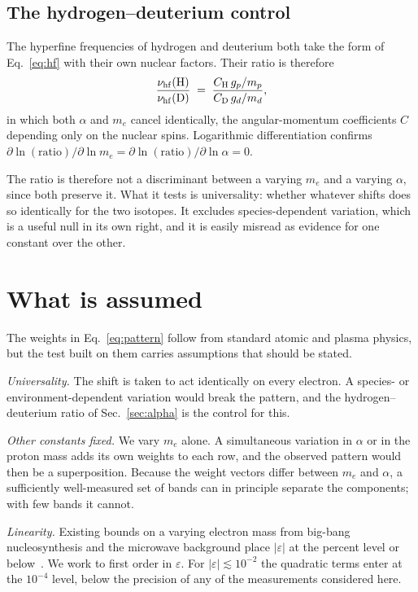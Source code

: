 \documentclass[aps,prd,twocolumn,superscriptaddress,nofootinbib,10pt]{revtex4-2}
\begin{document}
\subsection{The hydrogen--deuterium control}

The hyperfine frequencies of hydrogen and deuterium both take the form of Eq.~\eqref{eq:hf} with
their own nuclear factors. Their ratio is therefore
%
\begin{equation}
  \frac{\nu_{\rm hf}({\rm H})}{\nu_{\rm hf}({\rm D})}
  \;=\; \frac{C_{\rm H}\, g_p / m_p}{C_{\rm D}\, g_d / m_d},
\end{equation}
%
in which both $\alpha$ and $m_e$ cancel identically, the angular-momentum coefficients $C$
depending only on the nuclear spins. Logarithmic differentiation confirms
$\partial \ln(\text{ratio})/\partial \ln m_e = \partial \ln(\text{ratio})/\partial \ln \alpha = 0$.

The ratio is therefore not a discriminant between a varying $m_e$ and a varying $\alpha$, since
both preserve it. What it tests is universality: whether whatever shifts does so identically for
the two isotopes. It excludes species-dependent variation, which is a useful null in its own right,
and it is easily misread as evidence for one constant over the other.

\section{What is assumed}\label{sec:assume}

The weights in Eq.~\eqref{eq:pattern} follow from standard atomic and plasma physics, but the test
built on them carries assumptions that should be stated.

\emph{Universality.} The shift is taken to act identically on every electron. A species- or
environment-dependent variation would break the pattern, and the hydrogen--deuterium ratio of
Sec.~\ref{sec:alpha} is the control for this.

\emph{Other constants fixed.} We vary $m_e$ alone. A simultaneous variation in $\alpha$ or in the
proton mass adds its own weights to each row, and the observed pattern would then be a
superposition. Because the weight vectors differ between $m_e$ and $\alpha$, a sufficiently
well-measured set of bands can in principle separate the components; with few bands it cannot.

\emph{Linearity.} Existing bounds on a varying electron mass from big-bang nucleosynthesis and
the microwave background place $|\varepsilon|$ at the percent level or
below~\cite{SetoToda2023,HartChluba2020}. We work to first order in $\varepsilon$. For
$|\varepsilon| \lesssim 10^{-2}$ the quadratic terms enter at the $10^{-4}$ level, below the
precision of any of the measurements considered here.
\end{document}
